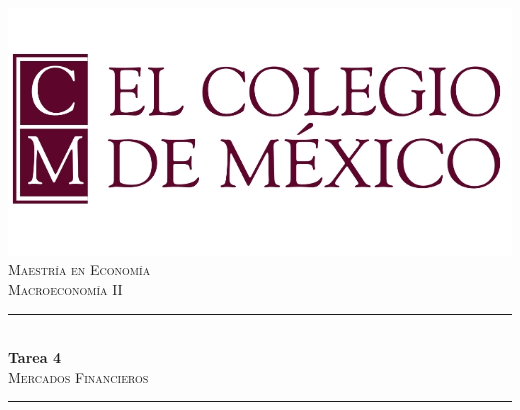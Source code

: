 \begin{titlepage}
	
	\newcommand{\HRule}{\rule{\linewidth}{0.5mm}} %
	
	\center %
	
	\includegraphics[]{colmex.jpg}\\ %
	
	\textsc{\Large Maestría en Economía}\\[1cm] %
	\textsc{\large  Macroeconomía II}\\[1.5cm] 
	
	
	\HRule \\[0.4cm]
	{ \Large \bfseries Tarea 4}\\[0.4cm] %
	\textsc{\Large Mercados Financieros}\\[1cm] %
	\HRule \\[1.2cm]
	
	

\end{titlepage}
